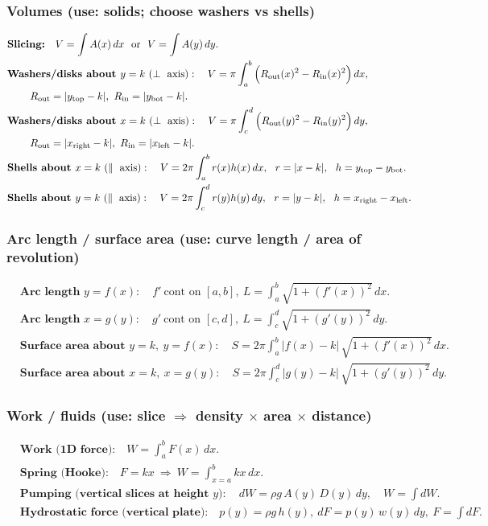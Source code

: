 \documentclass[12pt]{article}
\begin{document}
\subsubsection{Volumes (use: solids; choose washers vs shells)}
\begin{align*}
&\textbf{Slicing:}\quad V=\int A(x)\,dx\ \ \text{or}\ \ V=\int A(y)\,dy.\\
&\textbf{Washers/disks about }y=k\ (\perp\text{ axis}):\quad
V=\pi\int_a^b\Big(R_{\text{out}}(x)^2-R_{\text{in}}(x)^2\Big)\,dx,\\
&\hspace{2.2em}R_{\text{out}}=|y_{\text{top}}-k|,\ R_{\text{in}}=|y_{\text{bot}}-k|.\\
&\textbf{Washers/disks about }x=k\ (\perp\text{ axis}):\quad
V=\pi\int_c^d\Big(R_{\text{out}}(y)^2-R_{\text{in}}(y)^2\Big)\,dy,\\
&\hspace{2.2em}R_{\text{out}}=|x_{\text{right}}-k|,\ R_{\text{in}}=|x_{\text{left}}-k|.\\
&\textbf{Shells about }x=k\ (\parallel\text{ axis}):\quad
V=2\pi\int_a^b r(x)h(x)\,dx,\ \ r=|x-k|,\ \ h=y_{\text{top}}-y_{\text{bot}}.\\
&\textbf{Shells about }y=k\ (\parallel\text{ axis}):\quad
V=2\pi\int_c^d r(y)h(y)\,dy,\ \ r=|y-k|,\ \ h=x_{\text{right}}-x_{\text{left}}.
\end{align*}

\subsubsection{Arc length / surface area (use: curve length / area of revolution)}
\begin{align*}
&\textbf{Arc length }y=f(x):\quad f'\ \text{cont on }[a,b],\ L=\int_a^b\sqrt{1+(f'(x))^2}\,dx.\\
&\textbf{Arc length }x=g(y):\quad g'\ \text{cont on }[c,d],\ L=\int_c^d\sqrt{1+(g'(y))^2}\,dy.\\
&\textbf{Surface area about }y=k,\ y=f(x):\quad
S=2\pi\int_a^b |f(x)-k|\,\sqrt{1+(f'(x))^2}\,dx.\\
&\textbf{Surface area about }x=k,\ x=g(y):\quad
S=2\pi\int_c^d |g(y)-k|\,\sqrt{1+(g'(y))^2}\,dy.
\end{align*}

\subsubsection{Work / fluids (use: slice $\Rightarrow$ density $\times$ area $\times$ distance)}
\begin{align*}
&\textbf{Work (1D force):}\quad W=\int_a^b F(x)\,dx.\\
&\textbf{Spring (Hooke):}\quad F=kx\ \Rightarrow\ W=\int_{x=a}^{b}kx\,dx.\\
&\textbf{Pumping (vertical slices at height }y):\quad dW=\rho g\,A(y)\,D(y)\,dy,\quad W=\int dW.\\
&\textbf{Hydrostatic force (vertical plate):}\quad p(y)=\rho g\,h(y),\ dF=p(y)\,w(y)\,dy,\ F=\int dF.
\end{align*}
\end{document}
